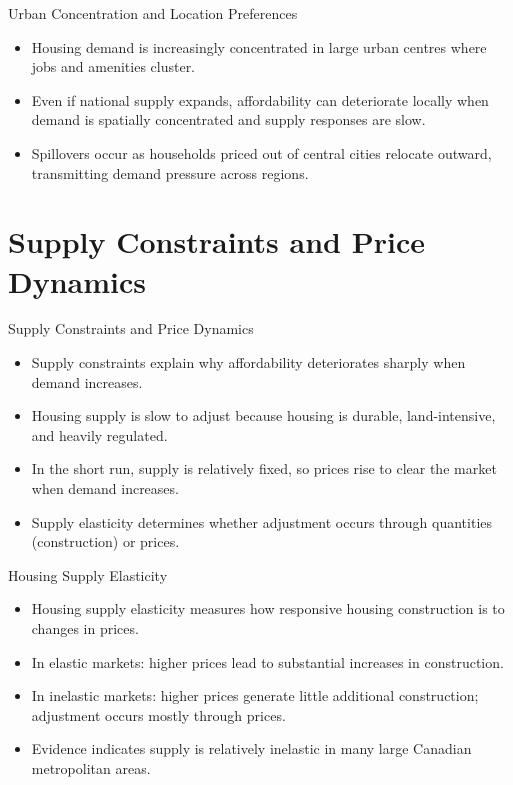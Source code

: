 \documentclass[aspectratio=169]{beamer}
\begin{document}
\begin{frame}{Urban Concentration and Location Preferences}
\transfade
\begin{itemize}[<+->]
  \item Housing demand is increasingly concentrated in large urban centres where jobs and amenities cluster.
  \item Even if national supply expands, affordability can deteriorate locally when demand is spatially concentrated and supply responses are slow.
  \item Spillovers occur as households priced out of central cities relocate outward, transmitting demand pressure across regions.
\end{itemize}
\end{frame}

\section{Supply Constraints and Price Dynamics}

\begin{frame}{Supply Constraints and Price Dynamics}
\transfade
\begin{itemize}[<+->]
  \item Supply constraints explain why affordability deteriorates sharply when demand increases.
  \item Housing supply is slow to adjust because housing is durable, land-intensive, and heavily regulated.
  \item In the short run, supply is relatively fixed, so prices rise to clear the market when demand increases.
  \item Supply elasticity determines whether adjustment occurs through quantities (construction) or prices.
\end{itemize}
\end{frame}

\begin{frame}{Housing Supply Elasticity}
\transfade
\begin{itemize}[<+->]
  \item Housing supply elasticity measures how responsive housing construction is to changes in prices.
  \item In elastic markets: higher prices lead to substantial increases in construction.
  \item In inelastic markets: higher prices generate little additional construction; adjustment occurs mostly through prices.
  \item Evidence indicates supply is relatively inelastic in many large Canadian metropolitan areas.
\end{itemize}
\end{frame}
\end{document}
